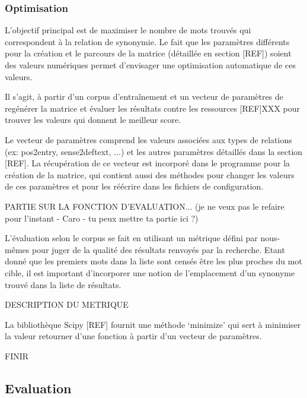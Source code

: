 \subsubsection{Optimisation}

L'objectif principal est de maximiser le nombre de mots trouvés qui correspondent à la relation de synonymie. Le fait que les paramètres différents pour la création et le parcours de la matrice (détaillée en section [REF]) soient des valeurs numériques permet d'envisager une optimisation automatique de ces valeurs.

Il s'agit, à partir d'un corpus d'entraînement et un vecteur de paramètres de regénérer la matrice et évaluer les résultats contre les ressources [REF]XXX pour trouver les valeurs qui donnent le meilleur score.

Le vecteur de paramètres comprend les valeurs associées aux types de relations (ex: pos2entry, sense2deftext, ...) et les autres paramètres détaillés dans la section [REF]. La récupération de ce vecteur est incorporé dans le programme pour la création de la matrice, qui contient aussi des méthodes pour changer les valeurs de ces paramètres et pour les réécrire dans les fichiers de configuration.

PARTIE SUR LA FONCTION D'EVALUATION... (je ne veux pas le refaire pour l'instant - Caro - tu peux mettre ta partie ici ?)

L'évaluation selon le corpus se fait en utilisant un métrique défini par nous-mêmes pour juger de la qualité des résultats renvoyés par la recherche. Etant donné que les premiers mots dans la liste sont censés être les plus proches du mot cible, il est important d'incorporer une notion de l'emplacement d'un synonyme trouvé dans la liste de résultats.

DESCRIPTION DU METRIQUE

La bibliothèque Scipy [REF] fournit une méthode \lq{minimize}\rq{} qui sert à minimiser la valeur retourner d'une fonction à partir d'un vecteur de paramètres.

FINIR



\subsection{Evaluation}

